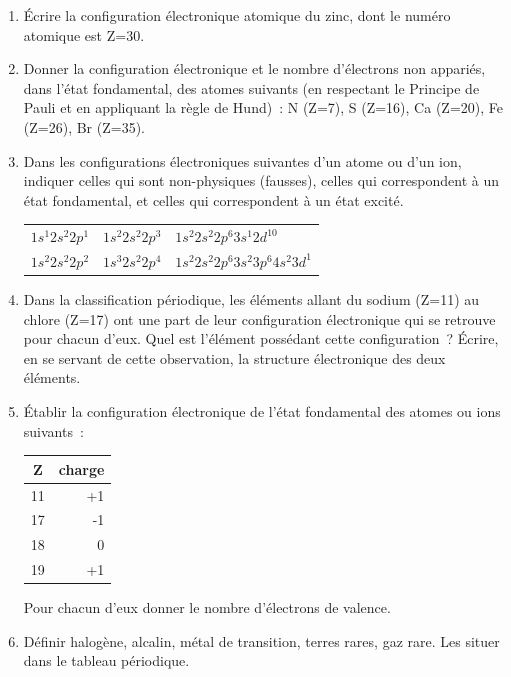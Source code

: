\begin{enumerate}[\bf 1)]
\item \'Ecrire la configuration \'electronique atomique du zinc, dont le num\'ero 
atomique est Z=30.

\item Donner la configuration \'electronique et le nombre d'\'electrons non 
appari\'es, dans l'\'etat fondamental, des atomes suivants (en respectant le 
Principe de Pauli et en appliquant la r\`egle de Hund)~: N (Z=7), S (Z=16), 
Ca (Z=20), Fe (Z=26), Br (Z=35).

\item Dans les configurations \'electroniques suivantes d'un atome ou d'un ion, 
indiquer celles qui sont non-physiques (fausses), celles qui correspondent 
\`a un \'etat fondamental, et celles qui correspondent \`a un \'etat excit\'e.

\begin{center}
\begin{tabular}{lll}
$1s^1 2s^2 2p^1$ & $1s^2 2s^2 2p^3$ & $1s^2 2s^2 2p^6 3s^1 2d^{10}$         \\
$1s^2 2s^2 2p^2$ & $1s^3 2s^2 2p^4$ & $1s^2 2s^2 2p^6 3s^2 3p^6 4s^2 3d^1$  \\
\end{tabular}
\end{center}

\item Dans la classification p\'eriodique, les \'el\'ements allant du sodium 
(Z=11) au chlore (Z=17) ont une part de leur configuration \'electronique qui 
se retrouve pour chacun d'eux. Quel est l'\'el\'ement poss\'edant cette 
configuration~?  \'Ecrire, en se servant de cette observation, la structure 
\'electronique des deux \'el\'ements.

\item \'Etablir la configuration \'electronique de l'\'etat fondamental 
des atomes ou ions suivants~:

\begin{center}
\begin{tabular}{c|r}\hline
Z & charge \\\hline
11 & +1 \\\hline
17 & -1 \\\hline
18 & 0  \\\hline
19 & +1 \\\hline
\end{tabular}
\end{center}

Pour chacun d'eux donner le nombre d'\'electrons de valence.

\item D\'efinir halog\`ene, alcalin, m\'etal de transition, terres rares, gaz rare. 
Les situer dans le tableau p\'eriodique.

\end{enumerate}
